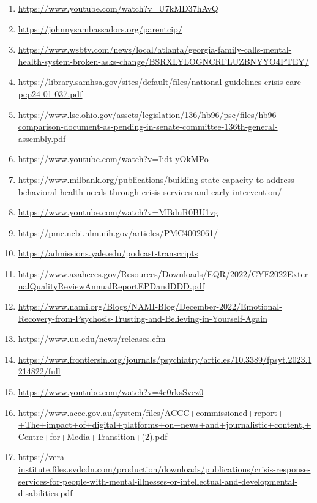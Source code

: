\documentclass[10pt,a4paper]{article}
\begin{document}
\begin{enumerate}[leftmargin=*]
            \item \url{ https://www.youtube.com/watch?v=U7kMD37hAvQ }
            \item \url{ https://johnnysambassadors.org/parentcip/ }
            \item \url{ https://www.wsbtv.com/news/local/atlanta/georgia-family-calls-mental-health-system-broken-asks-change/BSRXLYLOGNCRFLUZBNYYO4PTEY/ }
            \item \url{ https://library.samhsa.gov/sites/default/files/national-guidelines-crisis-care-pep24-01-037.pdf }
            \item \url{ https://www.lsc.ohio.gov/assets/legislation/136/hb96/psc/files/hb96-comparison-document-as-pending-in-senate-committee-136th-general-assembly.pdf }
            \item \url{ https://www.youtube.com/watch?v=Iidt-yOkMPo }
            \item \url{ https://www.milbank.org/publications/building-state-capacity-to-address-behavioral-health-needs-through-crisis-services-and-early-intervention/ }
            \item \url{ https://www.youtube.com/watch?v=MBduR0BU1vg }
            \item \url{ https://pmc.ncbi.nlm.nih.gov/articles/PMC4002061/ }
            \item \url{ https://admissions.yale.edu/podcast-transcripts }
            \item \url{ https://www.azahcccs.gov/Resources/Downloads/EQR/2022/CYE2022ExternalQualityReviewAnnualReportEPDandDDD.pdf }
            \item \url{ https://www.nami.org/Blogs/NAMI-Blog/December-2022/Emotional-Recovery-from-Psychosis-Trusting-and-Believing-in-Yourself-Again }
            \item \url{ https://www.uu.edu/news/releases.cfm }
            \item \url{ https://www.frontiersin.org/journals/psychiatry/articles/10.3389/fpsyt.2023.1214822/full }
            \item \url{ https://www.youtube.com/watch?v=4c0rksSvez0 }
            \item \url{ https://www.accc.gov.au/system/files/ACCC+commissioned+report+-+The+impact+of+digital+platforms+on+news+and+journalistic+content,+Centre+for+Media+Transition+(2).pdf }
            \item \url{ https://vera-institute.files.svdcdn.com/production/downloads/publications/crisis-response-services-for-people-with-mental-illnesses-or-intellectual-and-developmental-disabilities.pdf }
    \end{enumerate}
\vspace{1em}
\end{document}
